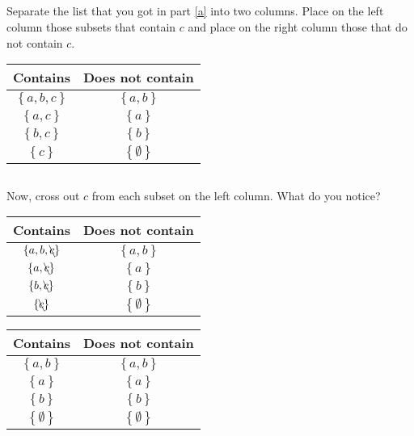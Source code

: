 \documentclass{article}
\begin{document}
\subsection{} \label{b}

Separate the list that you got in part \ref{a} into two columns. Place on the left column those subsets that contain $ c $ and place on the right column those that do not contain $ c $.

\begin{tabular}{ | c | c | }
	\textbf{Contains}            & \textbf{Does not contain}      \\
	\hline
	$ \left\{ a, b, c \right\} $ & $ \left\{ a, b \right\} $      \\
	$ \left\{ a, c \right\}    $ & $ \left\{ a \right\} $         \\
	$ \left\{ b, c \right\}    $ & $ \left\{ b \right\} $         \\
	$ \left\{ c \right\}       $ & $ \left\{ \emptyset \right\} $ \\
\end{tabular}

\subsection{} \label{c}

Now, cross out $ c $ from each subset on the left column. What do you notice?

\begin{tabular}{ | c | c | }
	\textbf{Contains}                      & \textbf{Does not contain}      \\
	\hline
	$ \left\{ a, b, \bcancel{c} \right\} $ & $ \left\{ a, b \right\} $      \\
	$ \left\{ a, \bcancel{c} \right\}    $ & $ \left\{ a \right\} $         \\
	$ \left\{ b, \bcancel{c} \right\}    $ & $ \left\{ b \right\} $         \\
	$ \left\{ \bcancel{c} \right\}       $ & $ \left\{ \emptyset \right\} $ \\
\end{tabular}

\begin{tabular}{ | c | c | }
	\textbf{Contains}                    & \textbf{Does not contain}      \\
	\hline
	$ \left\{ a, b \right\} $            & $ \left\{ a, b \right\} $      \\
	$ \left\{ a \right\}    $            & $ \left\{ a \right\} $         \\
	$ \left\{ b \right\}    $            & $ \left\{ b \right\} $         \\
	$ \left\{ \emptyset \right\}       $ & $ \left\{ \emptyset \right\} $ \\
\end{tabular}
\end{document}
